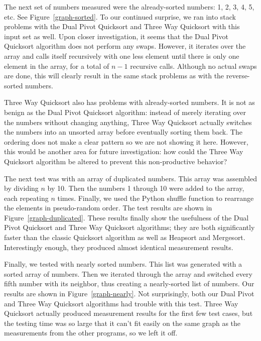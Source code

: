\documentclass{article}
\begin{document}
The next set of numbers measured were the already-sorted numbers: 1, 2, 3, 4, 5, etc.
See Figure~\ref{graph-sorted}.
To our continued surprise, we ran into stack problems with the Dual Pivot Quicksort and
Three Way Quicksort with this input set as well. Upon closer investigation, it seems that
the Dual Pivot Quicksort algorithm does not perform any swaps. However, it iterates over
the array and calls itself recursively with one less element until there is only one element
in the array, for a total of $n-1$ recursive calls. Although no actual swaps are done, this
will clearly result in the same stack problems as with the reverse-sorted numbers.

Three Way Quicksort also has problems with already-sorted numbers. It is not as benign 
as the Dual Pivot Quicksort algorithm: instead of merely iterating over the numbers without
changing anything, Three Way Quicksort actually switches the numbers into an unsorted
array before eventually sorting them back. The ordering does not make a clear pattern
so we are not showing it here. However, this would be another area for future investigation:
how could the Three Way Quicksort algorithm be altered to prevent this non-productive 
behavior?

The next test was with an array of duplicated numbers. This array was assembled by
dividing $n$ by 10. Then the numbers 1 through 10 were added to the array, each repeating $n$
times. Finally, we used the Python shuffle function to rearrange the elements in pseudo-random
order. The test results are shown in Figure~\ref{graph-duplicated}. These results finally show
the usefulness of the Dual Pivot Quicksort and Three Way Quicksort algorithms; they are 
both significantly faster than the classic Quicksort algorithm as well as Heapsort and Mergesort.
Interestingly enough, they produced almost identical measurement results.

Finally, we tested with nearly sorted numbers. This list was generated with a sorted array
of numbers. Then we iterated through the array and switched every fifth number with its 
neighbor, thus creating a nearly-sorted list of numbers. Our results are shown in 
Figure~\ref{graph-nearly}. Not surprisingly, both our Dual Pivot and Three Way Quicksort
algorithms had trouble with this test. Three Way Quicksort actually produced measurement
results for the first few test cases, but the testing time was so large that it can't fit easily
on the same graph as the measurements from the other programs, 
so we left it off.
\end{document}

